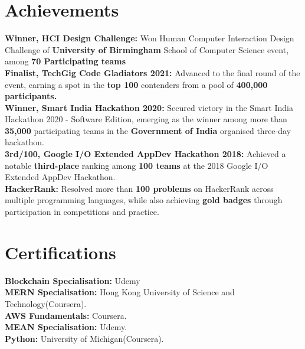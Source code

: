 \documentclass[letterpaper,11pt]{article}
\begin{document}
\section{Achievements}
 \begin{itemize}[leftmargin=0.15in, label={}]
    \small{\item{
     \textbf{Winner, HCI Design Challenge:}{ Won Human Computer Interaction Design Challenge of \textbf{University of Birmingham} School of Computer Science event, among \textbf{70 Participating teams}} \\
     \textbf{Finalist, TechGig Code Gladiators 2021:}{ Advanced to the final round of the event, earning a spot in the \textbf{top 100} contenders from a pool of \textbf{400,000 participants.}} \\
     \textbf{Winner, Smart India Hackathon 2020:}{ Secured victory in the Smart India Hackathon 2020 - Software Edition, emerging as the winner among more than \textbf{35,000} participating teams in the \textbf{Government of India} organised three-day hackathon.} \\
     \textbf{3rd/100, Google I/O Extended AppDev Hackathon 2018:}{ Achieved a notable \textbf{third-place} ranking among \textbf{100 teams} at the 2018 Google I/O Extended AppDev Hackathon.} \\
     \textbf{HackerRank:}{ Resolved more than \textbf{100 problems} on HackerRank across multiple programming languages, while also achieving \textbf{gold badges} through participation in competitions and practice.} \\
    }}
 \end{itemize}

\section{Certifications}
 \begin{itemize}[leftmargin=0.15in, label={}]
    \small{\item{
     \textbf{Blockchain Specialisation:}{ Udemy} \\
     \textbf{MERN Specialisation:}{ Hong Kong University of Science and Technology(Coursera).} \\
     \textbf{AWS Fundamentals:}{ Coursera.} \\
     \textbf{MEAN Specialisation:}{ Udemy.} \\
     \textbf{Python:}{ University of Michigan(Coursera).} \\
    }}
 \end{itemize}
\end{document}
